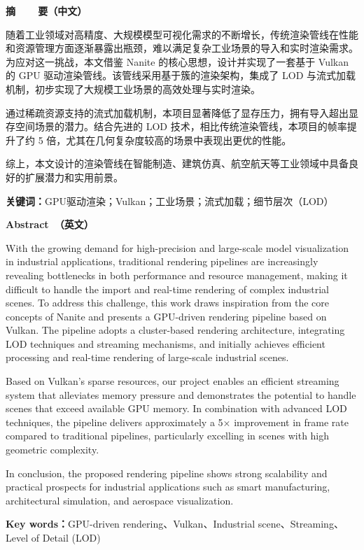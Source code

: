 \cleardoublepage{}

\vspace*{-2em}

\begin{center}
    \bfseries {} 摘~~~~要（中文）
\end{center}

随着工业领域对高精度、大规模模型可视化需求的不断增长，传统渲染管线在性能和资源管理方面逐渐暴露出瓶颈，难以满足复杂工业场景的导入和实时渲染需求。为应对这一挑战，本文借鉴 Nanite 的核心思想，设计并实现了一套基于 Vulkan 的 GPU 驱动渲染管线。该管线采用基于簇的渲染架构，集成了 LOD 与流式加载机制，初步实现了大规模工业场景的高效处理与实时渲染。

通过稀疏资源支持的流式加载机制，本项目显著降低了显存压力，拥有导入超出显存空间场景的潜力。结合先进的 LOD 技术，相比传统渲染管线，本项目的帧率提升了约 5 倍，尤其在几何复杂度较高的场景中表现出更优的性能。

综上，本文设计的渲染管线在智能制造、建筑仿真、航空航天等工业领域中具备良好的扩展潜力和实用前景。

\vspace{1em}

\noindent\textbf{关键词：}GPU驱动渲染；Vulkan；工业场景；流式加载；细节层次（LOD）

\cleardoublepage{}

\vspace*{-2em}

\begin{center}
    \bfseries {} Abstract~（英文）
\end{center}

With the growing demand for high-precision and large-scale model visualization in industrial applications, traditional rendering pipelines are increasingly revealing bottlenecks in both performance and resource management, making it difficult to handle the import and real-time rendering of complex industrial scenes. To address this challenge, this work draws inspiration from the core concepts of Nanite and presents a GPU-driven rendering pipeline based on Vulkan. The pipeline adopts a cluster-based rendering architecture, integrating LOD techniques and streaming mechanisms, and initially achieves efficient processing and real-time rendering of large-scale industrial scenes.

Based on Vulkan's sparse resources, our project enables an efficient streaming system that alleviates memory pressure and demonstrates the potential to handle scenes that exceed available GPU memory. In combination with advanced LOD techniques, the pipeline delivers approximately a 5× improvement in frame rate compared to traditional pipelines, particularly excelling in scenes with high geometric complexity.

In conclusion, the proposed rendering pipeline shows strong scalability and practical prospects for industrial applications such as smart manufacturing, architectural simulation, and aerospace visualization.

\vspace{1em}

\noindent\textbf{Key words：}GPU-driven rendering、Vulkan、Industrial scene、Streaming、Level of Detail (LOD)